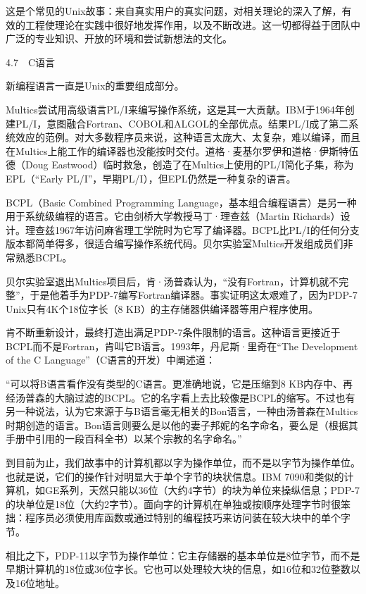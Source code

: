 \documentclass[a4paper,12pt,UTF8,twoside]{ctexbook}
\begin{document}
{这是个常见的Unix故事：来自真实用户的真实问题，对相关理论的深入了解，有效的工程使理论在实践中很好地发挥作用，以及不断改进。这一切都得益于团队中广泛的专业知识、开放的环境和尝试新想法的文化。





4.7　C语言


新编程语言一直是Unix的重要组成部分。

Multics尝试用高级语言PL/I来编写操作系统，这是其一大贡献。IBM于1964年创建PL/I，意图融合Fortran、COBOL和ALGOL的全部优点。结果PL/I成了第二系统效应的范例。对大多数程序员来说，这种语言太庞大、太复杂，难以编译，而且在Multics上能工作的编译器也没能按时交付。道格·麦基尔罗伊和道格·伊斯特伍德（Doug Eastwood）临时救急，创造了在Multics上使用的PL/I简化子集，称为EPL（“Early PL/I”，早期PL/I），但EPL仍然是一种复杂的语言。

BCPL（Basic Combined Programming Language，基本组合编程语言）是另一种用于系统级编程的语言。它由剑桥大学教授马丁·理查兹（Martin Richards）设计。理查兹1967年访问麻省理工学院时为它写了编译器。BCPL比PL/I的任何分支版本都简单得多，很适合编写操作系统代码。贝尔实验室Multics开发组成员们非常熟悉BCPL。

贝尔实验室退出Multics项目后，肯·汤普森认为，“没有Fortran，计算机就不完整”，于是他着手为PDP-7编写Fortran编译器。事实证明这太艰难了，因为PDP-7 Unix只有4K个18位字长（8 KB）的主存储器供编译器等用户程序使用。

肯不断重新设计，最终打造出满足PDP-7条件限制的语言。这种语言更接近于BCPL而不是Fortran，肯叫它B语言。1993年，丹尼斯·里奇在“The Development of the C Language”（C语言的开发）中阐述道：

“可以将B语言看作没有类型的C语言。更准确地说，它是压缩到8 KB内存中、再经汤普森的大脑过滤的BCPL。它的名字看上去比较像是BCPL的缩写。不过也有另一种说法，认为它来源于与B语言毫无相关的Bon语言，一种由汤普森在Multics时期创造的语言。Bon语言则要么是以他的妻子邦妮的名字命名，要么是（根据其手册中引用的一段百科全书）以某个宗教的名字命名。”



到目前为止，我们故事中的计算机都以字为操作单位，而不是以字节为操作单位。也就是说，它们的操作针对明显大于单个字节的块状信息。IBM 7090和类似的计算机，如GE系列，天然只能以36位（大约4字节）的块为单位来操纵信息；PDP-7的块单位是18位（大约2字节）。面向字的计算机在单独或按顺序处理字节时很笨拙：程序员必须使用库函数或通过特别的编程技巧来访问装在较大块中的单个字节。

相比之下，PDP-11以字节为操作单位：它主存储器的基本单位是8位字节，而不是早期计算机的18位或36位字长。它也可以处理较大块的信息，如16位和32位整数以及16位地址。

}
\end{document}
